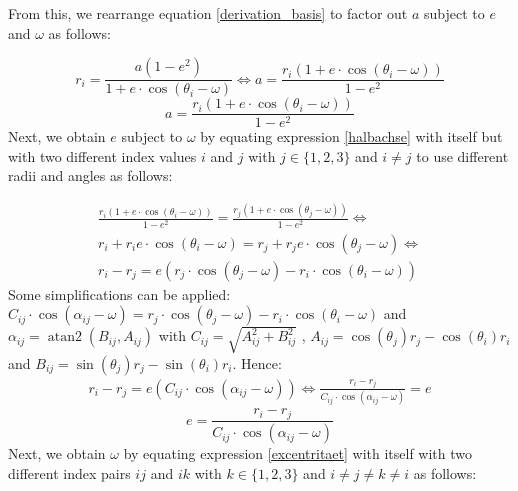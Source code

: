 \documentclass[11pt,a4paper]{article}
\DeclareMathOperator{\atantwo}{atan2}
\begin{document}
	\noindent
	From this, we rearrange equation \ref{derivation_basis} to factor out $a$ subject to $e$ and $\omega$ as follows:
	
	\begin{equation*}
		r_i=\frac{a(1-e^2)}{1+e\cdot\cos(\theta_i-\omega)} \Leftrightarrow a=\frac{r_i(1+e\cdot\cos(\theta_i-\omega))}{1-e^2}
	\end{equation*}
	\begin{equation}\label{halbachse}
		\boxed{a=\frac{r_i(1+e\cdot\cos(\theta_i-\omega))}{1-e^2}}
	\end{equation}
	Next, we obtain $e$ subject to $\omega$ by equating expression \ref{halbachse} with itself but with two different index values $i$ and $j$ with $j \in \{1,2,3\}$ and $i \neq j$ to use different radii and angles as follows:
	
	\begin{equation*}
		\begin{aligned}
			\frac{r_i(1+e\cdot\cos(\theta_i-\omega))}{1-e^2}=\frac{r_j(1+e\cdot\cos(\theta_j-\omega))}{1-e^2} \Leftrightarrow \\
			r_i+r_ie\cdot\cos(\theta_i-\omega)=r_j+r_je\cdot\cos(\theta_j-\omega) \Leftrightarrow \\
			r_i-r_j=e(r_j\cdot\cos(\theta_j-\omega)-r_i\cdot\cos(\theta_i-\omega))
		\end{aligned}
	\end{equation*}
	\noindent
	Some simplifications can be applied:\newline $C_{ij}\cdot\cos(\alpha_{ij}-\omega) = r_j\cdot\cos(\theta_j-\omega)-r_i\cdot\cos(\theta_i-\omega)$ and \newline
	$\alpha_{ij}=\atantwo(B_{ij}, A_{ij})$ with \newline $C_{ij}=\sqrt{A_{ij}^2+B_{ij}^2}$ , $A_{ij}=\cos(\theta_j)r_j-\cos(\theta_i)r_i$ and $B_{ij}=\sin(\theta_j)r_j-\sin(\theta_i)r_i$.\newline
	Hence:
	\newline
	\begin{equation*}
		\begin{aligned}
			r_i-r_j=e(C_{ij}\cdot\cos(\alpha_{ij}-\omega)) \Leftrightarrow 
			\frac{r_i-r_j}{C_{ij}\cdot\cos(\alpha_{ij}-\omega)}=e
		\end{aligned}
	\end{equation*}
	\begin{equation}\label{excentritaet}
		\boxed{e=\frac{r_i-r_j}{C_{ij}\cdot\cos(\alpha_{ij}-\omega)}}
	\end{equation}
	\noindent
	Next, we obtain $\omega$ by equating expression \ref{excentritaet} with itself with two different index pairs $ij$ and $ik$ with $k \in \{1,2,3\}$ and $i \neq j \neq k \neq i$ as follows:
	
\end{document}
